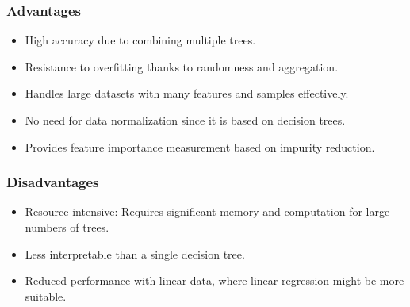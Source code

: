 \smallskip
\subsubsection{Advantages}

\begin{itemize}
    \item High accuracy due to combining multiple trees.
    \item Resistance to overfitting thanks to randomness and aggregation.
    \item Handles large datasets with many features and samples effectively.
    \item No need for data normalization since it is based on decision trees.
    \item Provides feature importance measurement based on impurity reduction.
\end{itemize}

\smallskip
\subsubsection{Disadvantages}

\begin{itemize}
    \item Resource-intensive: Requires significant memory and computation for large numbers of trees.
    \item Less interpretable than a single decision tree.
    \item Reduced performance with linear data, where linear regression might be more suitable.
\end{itemize}